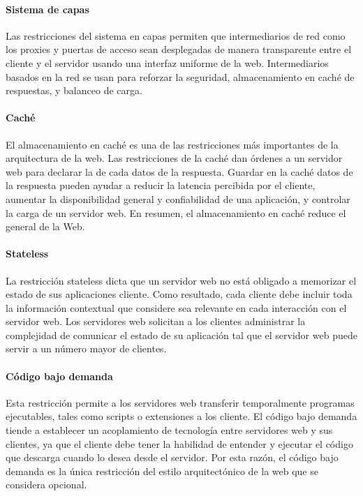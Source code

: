 \paragraph{Sistema de capas}
\label{\detokenize{chapter_one/rest:sistema-de-capas}}
Las restricciones del sistema en capas permiten que intermediarios de red como
los proxies y puertas de acceso sean desplegadas de manera transparente entre el cliente
y el servidor usando una interfaz uniforme de la web. Intermediarios basados
en la red se usan para reforzar la seguridad, almacenamiento en caché de
respuestas, y balanceo de carga.


\paragraph{Caché}
\label{\detokenize{chapter_one/rest:cache}}
El almacenamiento en caché es una de las restricciones más importantes de la
arquitectura de la web. Las restricciones de la caché dan órdenes a un servidor
web para declarar la  de cada datos de la respuesta.
Guardar en la caché datos de la respuesta pueden ayudar a reducir
la latencia percibida por el cliente, aumentar la disponibilidad
general y confiabilidad de una aplicación, y controlar la carga
de un servidor web. En resumen, el almacenamiento en caché
reduce el  general de la Web.


\paragraph{Stateless}
\label{\detokenize{chapter_one/rest:stateless}}
La restricción stateless dicta que un servidor web no está obligado
a memorizar el estado de sus aplicaciones cliente. Como resultado,
cada cliente debe incluir toda la información contextual que considere
sea relevante en cada interacción con el servidor web. Los servidores
web solicitan a los clientes administrar la complejidad de comunicar
el estado de su aplicación tal que el servidor web puede servir a un número
mayor de clientes.


\paragraph{Código bajo demanda}
\label{\detokenize{chapter_one/rest:codigo-bajo-demanda}}
Esta restricción permite a los servidores web transferir temporalmente
programas ejecutables, tales como scripts o extensiones a los cliente.
El código bajo demanda tiende a establecer un acoplamiento de tecnología
entre servidores web y sus clientes, ya que el cliente debe tener la habilidad
de entender y ejecutar el código que descarga cuando lo desea desde el servidor.
Por esta razón, el código bajo demanda es la única restricción del
estilo arquitectónico de la web que se considera opcional.


